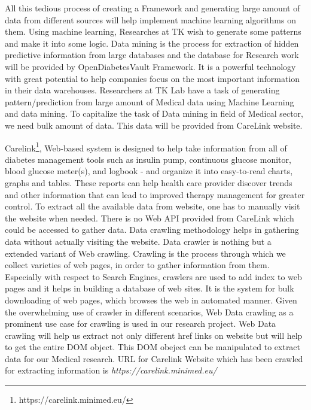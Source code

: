 \documentclass[article,type=msc,colorback,accentcolor=tud9c,twoside,11pt]{tudthesis}
\begin{document}
	All this tedious process of creating a Framework and generating large amount of data from different sources will help implement machine learning algorithms on them. Using machine learning, Researches at TK wish to generate some patterns and make it into some logic. Data mining is the process for extraction of hidden predictive information from large databases and the database for Research work will be provided by OpenDiabetesVault Framework. It is a powerful technology with great potential to help companies focus on the most important information in their data warehouses. Researchers at TK Lab have a task of generating pattern/prediction from large amount of Medical data using Machine Learning and data mining. To capitalize the task of Data mining in field of Medical sector, we need bulk amount of data. This data will be provided from CareLink website. 
	
	Carelink\footnote{https://carelink.minimed.eu/}, Web-based system is designed to help take information from all of diabetes management tools such as insulin pump, continuous glucose monitor, blood glucose meter(s), and logbook - and organize it into easy-to-read charts, graphs and tables. These reports can help health care provider discover trends and other information that can lead to improved therapy management for greater control. To extract all the available data from website, one has to manually visit the website when needed. There is no Web API provided from CareLink which could be accessed to gather data. Data crawling methodology helps in gathering data without actually visiting the website. Data crawler is nothing but a extended variant of Web crawling. Crawling is the process through which we collect varieties of web pages, in order to gather information from them. Especially with respect to Search Engines, crawlers are used to add index to web pages and it helps in building a database of web sites. It is the system for bulk downloading of web pages, which browses the web in automated manner. Given the overwhelming use of crawler in different scenarios, Web Data crawling as a prominent use case for crawling is used in our research project. Web Data crawling will help us extract not only different href links on website but will help to get the entire DOM object. This DOM obeject can be manipulated to extract data for our Medical research. URL for Carelink Website which has been crawled for extracting information is \textit{https://carelink.minimed.eu/}
	
\end{document}

